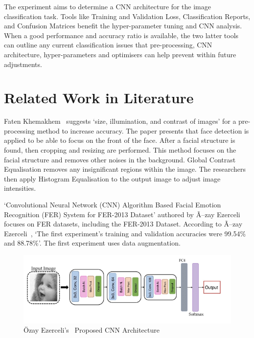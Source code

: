 \documentclass[conference]{IEEEtran}
\begin{document}
      The experiment aims to determine a CNN architecture for the image classification task. Tools like Training and Validation Loss, Classification Reports, and Confusion Matrices benefit the hyper-parameter tuning and CNN analysis. When a good performance and accuracy ratio is available, the two latter tools can outline any current classification issues that pre-processing, CNN architecture, hyper-parameters and optimisers can help prevent within future adjustments.
      
    \section{Related Work in Literature}
      Faten Khemakhem~\cite{khemakhem_facial_2019} suggests `size, illumination, and contrast of images' for a pre-processing method to increase accuracy. The paper presents that face detection is applied to be able to focus on the front of the face. After a facial structure is found, then cropping and resizing are performed. This method focuses on the facial structure and removes other noises in the background. Global Contrast Equalisation removes any insignificant regions within the image. The researchers then apply Histogram Equalisation to the output image to adjust image intensities.

      `Convolutional Neural Network (CNN) Algorithm Based Facial Emotion Recognition (FER) System for FER-2013 Dataset' authored by Ã–zay Ezerceli~\cite{ezerceli_convolutional_2022} focuses on FER datasets, including the FER-2013 Dataset. According to Ã–zay Ezerceli~\cite{ezerceli_convolutional_2022}, `The first experiment's training and validation accuracies were 99.54\% and 88.78\%'. The first experiment uses data augmentation.

      \begin{figure}[htp]
        \centering
        \includegraphics[width=\columnwidth]{Figures/CustomArch.png}
        \caption{Özay Ezerceli's~\cite{ezerceli_convolutional_2022} Proposed CNN Architecture}
        \label{fig:ozayCNNArchitecture}
      \end{figure}
      
\end{document}
